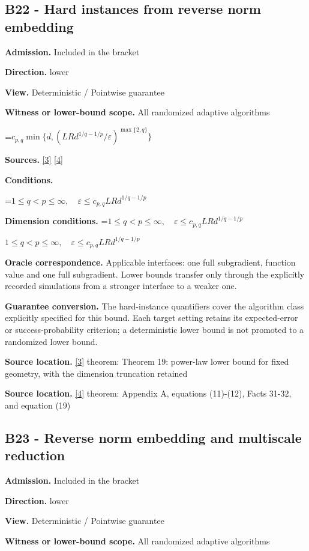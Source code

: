 \documentclass[10pt,a4paper]{article}
\newcommand{\AtlasMath}[1]{\par\begingroup\centering\setbox0=\hbox{$\displaystyle #1$}\ifdim\wd0>1.4\linewidth\typeout{ATLAS WIDE FORMULA: \the\wd0}\fi\ifdim\wd0>\linewidth\resizebox{\linewidth}{!}{\box0}\else\box0\fi\par\endgroup}
\newcommand{\AtlasInlineMath}[1]{\begingroup\setbox0=\hbox{$#1$}\ifdim\wd0>.4\linewidth\endgroup\AtlasMath{#1}\else\endgroup$#1$\fi}
\begin{document}
\subsection{B22 - Hard instances from reverse norm embedding}
\textbf{Admission.} Included in the bracket

\textbf{Direction.} lower

\textbf{View.} Deterministic / Pointwise guarantee

\textbf{Witness or lower-bound scope.} All randomized adaptive algorithms

\AtlasMath{c_{p,q}\min\{d,(LRd^{1/q-1/p}/\varepsilon)^{\max\{2,q\}}\}}
\textbf{Sources.} \href{https://arxiv.org/pdf/2609.20701}{[3]} \href{https://arxiv.org/pdf/2609.20687}{[4]}

\textbf{Conditions.} 
\AtlasMath{1\le q<p\le\infty,\quad\varepsilon\le c_{p,q}LRd^{1/q-1/p}}


\textbf{Dimension conditions.} \AtlasInlineMath{1\le q<p\le\infty,\quad\varepsilon\le c_{p,q}LRd^{1/q-1/p}}

\textbf{Oracle correspondence.} Applicable interfaces: one full subgradient, function value and one full subgradient. Lower bounds transfer only through the explicitly recorded simulations from a stronger interface to a weaker one.

\textbf{Guarantee conversion.} The hard-instance quantifiers cover the algorithm class explicitly specified for this bound. Each target setting retains its expected-error or success-probability criterion; a deterministic lower bound is not promoted to a randomized lower bound.

\textbf{Source location.} \href{https://arxiv.org/pdf/2609.20701}{[3]} theorem: Theorem 19: power-law lower bound for fixed geometry, with the dimension truncation retained

\textbf{Source location.} \href{https://arxiv.org/pdf/2609.20687}{[4]} theorem: Appendix A, equations (11)-(12), Facts 31-32, and equation (19)

\subsection{B23 - Reverse norm embedding and multiscale reduction}
\textbf{Admission.} Included in the bracket

\textbf{Direction.} lower

\textbf{View.} Deterministic / Pointwise guarantee

\textbf{Witness or lower-bound scope.} All randomized adaptive algorithms
\end{document}
